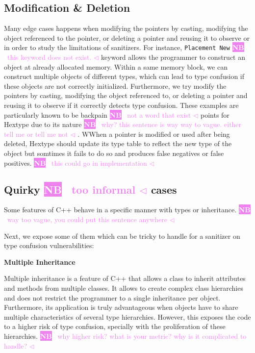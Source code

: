 \documentclass[a4paper,11pt,oneside]{report}
\newcommand{\todobox}[3]{%
       \colorbox{#1}{\textcolor{white}{\sffamily\bfseries\scriptsize #2}}%
       ~\textcolor{#1}{#3} %
       \textcolor{#1}{$\triangleleft$}%
}
\newcommand{\nb}[1]{\todobox{violet}{NB}{#1}}
\begin{document}
\subsection{Modification \& Deletion}

\noindent{}Many edge cases happens when modifying the pointers by casting,
modifying the object referenced to the pointer, or deleting a pointer and
reusing it to observe or in order to study the limitations of sanitizers. For
instance, \texttt{Placement New} \nb{this keyword does not exist.}keyword allows the programmer to construct an
object at already allocated memory.  Within a same memory block, we can
construct multiple objects of different types, which can lead to type confusion
if these objects are not correctly initialized. Furthermore, we try modify the
pointers by casting, modifying the object referenced to, or deleting a pointer
and reusing it to observe if it correctly detects type confusion. These examples
are particularly known to be backpain \nb{not a word that exist} points for Hextype due to its nature\nb{why? this sentence is way way to vague. either tell me or tell me not}.
WWhen a pointer is modified or used after being deleted, Hextype should update 
its type table to reflect the new type of the object but somtimes it fails to do
so and produces false negatives or false positives. \nb{this could go in implementation}

\subsection{Quirky\nb{too informal} cases}

Some features of C++ behave in a specific manner with types or inheritance. \nb{way too vague, you could put this sentence anywhere}
Next, we expose some of them which can be tricky to handle for a sanitizer on
type confusion vulnerabilities:

\textbf{Multiple Inheritance}

\noindent{}Multiple inheritance is a feature of C++ that allows a class to
inherit attributes and methods from multiple classes.  It allows to create
complex class hierarchies and does not restrict the programmer to a single
inheritance per object. Furthermore, its application is truly advantageous when
objects have to share multiple characteristics of several type hierarchies. 
However, this exposes the code to a higher risk of type confusion, specially
with the proliferation of these hierarchies.   \nb{why higher risk? what is your metric? why is it complicated to handle?}
\end{document}
